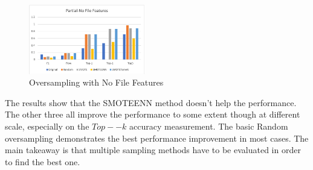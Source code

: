 \begin{figure}[!ht]
\begin{center}
\includegraphics[width=0.45\textwidth]{./figure/partial-nofile-oversampling}
\end{center}
\caption{Oversampling with No File Features}
\label{fig:dt}
\end{figure}

The results show that the SMOTEENN method doesn't help the performance. The other three all improve the performance to some extent though at different scale, especially on the $Top--k$ accuracy measurement. The basic Random oversampling demonstrates the best performance improvement in most cases.  The main takeaway is that multiple sampling methods have to be evaluated in order to find the best one.
